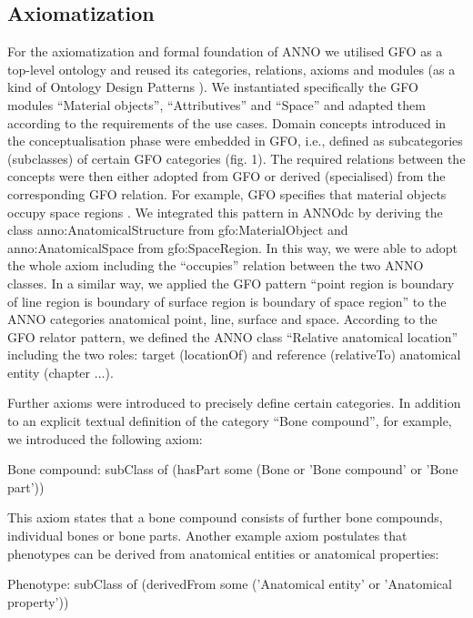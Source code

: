 \documentclass[sw]{iosart2x}
\begin{document}
\subsection{Axiomatization}

For the axiomatization and formal foundation of ANNO we utilised GFO as a top-level ontology and reused its categories, relations, axioms and modules (as a kind of Ontology Design Patterns \citep{ODP2005, XD2016, MOMo2023}).
We instantiated specifically the GFO modules \enquote{Material objects}, \enquote{Attributives} and \enquote{Space} \citep{Burek2020, Loebe2021, Loebe2018} and adapted them according to the requirements of the use cases.
Domain concepts introduced in the conceptualisation phase were embedded in GFO, i.e., defined as subcategories (subclasses) of certain GFO categories (fig. 1).
The required relations between the concepts were then either adopted from GFO or derived (specialised) from the corresponding GFO relation.
For example, GFO specifies that material objects occupy space regions \citep{Loebe2021}.
We integrated this pattern in ANNOdc by deriving the class anno:AnatomicalStructure from gfo:MaterialObject and anno:AnatomicalSpace from gfo:SpaceRegion.
In this way, we were able to adopt the whole axiom including the \enquote{occupies} relation between the two ANNO classes.
In a similar way, we applied the GFO pattern \enquote{point region is boundary of line region is boundary of surface region is boundary of space region} \citep{baumann2016} to the ANNO categories anatomical point, line, surface and space.
According to the GFO relator \citep{Loebe2018} pattern, we defined the ANNO class \enquote{Relative anatomical location} including the two roles: target (locationOf) and reference (relativeTo) anatomical entity (chapter $\ldots$).

Further axioms were introduced to precisely define certain categories.
In addition to an explicit textual definition of the category \enquote{Bone compound}, for example, we introduced the following axiom:

Bone compound: subClass of (hasPart some (Bone or 'Bone compound' or 'Bone part'))

This axiom states that a bone compound consists of further bone compounds, individual bones or bone parts.
Another example axiom postulates that phenotypes can be derived from anatomical entities or anatomical properties:

Phenotype: subClass of (derivedFrom some ('Anatomical entity' or 'Anatomical property'))
\end{document}

